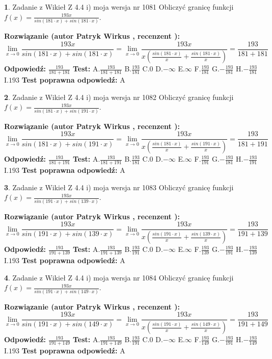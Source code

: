 \documentclass[12pt, a4paper]{article}
\theoremstyle{definition} %
\newtheorem{zad}{}
\newcommand{\zadStart}[1]{\begin{zad}#1\newline}
\newcommand{\zadStop}{\end{zad}}
\newcommand{\rozwStart}[2]{\noindent \textbf{Rozwiązanie (autor #1 , recenzent #2): }\newline}
\newcommand{\rozwStop}{\newline}
\newcommand{\odpStart}{\noindent \textbf{Odpowiedź:}\newline}
\newcommand{\odpStop}{\newline}
\newcommand{\testStart}{\noindent \textbf{Test:}\newline}
\newcommand{\testStop}{\newline}
\newcommand{\kluczStart}{\noindent \textbf{Test poprawna odpowiedź:}\newline}
\newcommand{\kluczStop}{\newline}
\begin{document}
\zadStart{Zadanie z Wikieł Z 4.4 i) moja wersja nr 1081}
Obliczyć granicę funkcji $f(x)=\frac{193x}{sin(181\cdot x) +sin(181\cdot x)}$.
\zadStop
\rozwStart{Patryk Wirkus}{}
$$\lim\limits_{x\to 0}\frac{193x}{sin(181\cdot x) +sin(181\cdot x)}=\lim\limits_{x\to 0}\frac{193x}{x(\frac{sin(181\cdot x)}{x}+\frac{sin(181\cdot x)}{x})}=\frac{193}{181+181}$$
\rozwStop
\odpStart
$\frac{193}{181+181}$
\odpStop
\testStart
A.$\frac{193}{181+181}$
B.$\frac{193}{181}$
C.$0$
D.$-\infty$
E.$\infty$
F.$\frac{193}{181}$
G.$-\frac{193}{181}$
H.$-\frac{193}{181}$
I.$193$
\testStop
\kluczStart
A
\kluczStop



\zadStart{Zadanie z Wikieł Z 4.4 i) moja wersja nr 1082}
Obliczyć granicę funkcji $f(x)=\frac{193x}{sin(181\cdot x) +sin(191\cdot x)}$.
\zadStop
\rozwStart{Patryk Wirkus}{}
$$\lim\limits_{x\to 0}\frac{193x}{sin(181\cdot x) +sin(191\cdot x)}=\lim\limits_{x\to 0}\frac{193x}{x(\frac{sin(181\cdot x)}{x}+\frac{sin(191\cdot x)}{x})}=\frac{193}{181+191}$$
\rozwStop
\odpStart
$\frac{193}{181+191}$
\odpStop
\testStart
A.$\frac{193}{181+191}$
B.$\frac{193}{181}$
C.$0$
D.$-\infty$
E.$\infty$
F.$\frac{193}{191}$
G.$-\frac{193}{181}$
H.$-\frac{193}{191}$
I.$193$
\testStop
\kluczStart
A
\kluczStop



\zadStart{Zadanie z Wikieł Z 4.4 i) moja wersja nr 1083}
Obliczyć granicę funkcji $f(x)=\frac{193x}{sin(191\cdot x) +sin(139\cdot x)}$.
\zadStop
\rozwStart{Patryk Wirkus}{}
$$\lim\limits_{x\to 0}\frac{193x}{sin(191\cdot x) +sin(139\cdot x)}=\lim\limits_{x\to 0}\frac{193x}{x(\frac{sin(191\cdot x)}{x}+\frac{sin(139\cdot x)}{x})}=\frac{193}{191+139}$$
\rozwStop
\odpStart
$\frac{193}{191+139}$
\odpStop
\testStart
A.$\frac{193}{191+139}$
B.$\frac{193}{191}$
C.$0$
D.$-\infty$
E.$\infty$
F.$\frac{193}{139}$
G.$-\frac{193}{191}$
H.$-\frac{193}{139}$
I.$193$
\testStop
\kluczStart
A
\kluczStop



\zadStart{Zadanie z Wikieł Z 4.4 i) moja wersja nr 1084}
Obliczyć granicę funkcji $f(x)=\frac{193x}{sin(191\cdot x) +sin(149\cdot x)}$.
\zadStop
\rozwStart{Patryk Wirkus}{}
$$\lim\limits_{x\to 0}\frac{193x}{sin(191\cdot x) +sin(149\cdot x)}=\lim\limits_{x\to 0}\frac{193x}{x(\frac{sin(191\cdot x)}{x}+\frac{sin(149\cdot x)}{x})}=\frac{193}{191+149}$$
\rozwStop
\odpStart
$\frac{193}{191+149}$
\odpStop
\testStart
A.$\frac{193}{191+149}$
B.$\frac{193}{191}$
C.$0$
D.$-\infty$
E.$\infty$
F.$\frac{193}{149}$
G.$-\frac{193}{191}$
H.$-\frac{193}{149}$
I.$193$
\testStop
\kluczStart
A
\kluczStop
\end{document}
